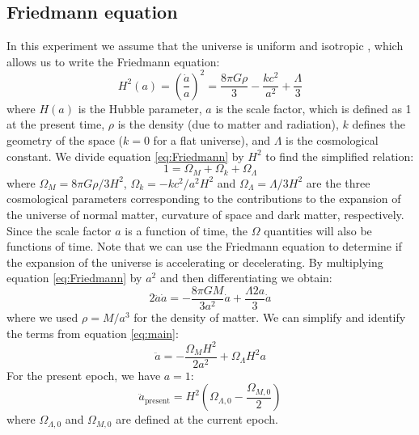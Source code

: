 \documentclass[11pt]{article}
\begin{document}
\subsection{Friedmann equation}
In this experiment we assume that the universe is uniform and isotropic \cite{AS37_lab_script}, which allows us to write the Friedmann equation: 
\begin{equation}
	H^2(a) = \left( \frac{\dot{a}}{a} \right)^2 = \frac{8 \pi G \rho}{3} - \frac{k c^2}{a^2} + \frac{\Lambda}{3}
	\label{eq:Friedmann}
\end{equation}
where $H(a)$ is the Hubble parameter, $a$ is the scale factor, which is defined as 1 at the present time, $\rho$ is the density (due to matter and radiation), $k$ defines the geometry of the space ($k=0$ for a flat universe), and $\Lambda$ is the cosmological constant. We divide equation \eqref{eq:Friedmann} by $H^2$ to find the simplified relation: 
\begin{equation}
	1 = \Omega_M +\Omega_k + \Omega_\Lambda
	\label{eq:main}
\end{equation}
where $\Omega_M = 8 \pi G \rho / 3 H^2$, $\Omega_k = - k c^2 / a^2 H^2$ and $\Omega_\Lambda = \Lambda / 3 H^2$ are the three cosmological parameters corresponding to the contributions to the expansion of the universe of normal matter, curvature of space and dark matter, respectively. Since the scale factor $a$ is a function of time, the $\Omega$ quantities will also be functions of time. 
Note that we can use the Friedmann equation to determine if the expansion of the universe is accelerating or decelerating. By multiplying equation \eqref{eq:Friedmann} by $a^2$ and then differentiating we obtain: 
\begin{equation}
	2 \ddot{a} \dot{a} = -\frac{8 \pi G M}{3 a^2} \dot{a} + \frac{\Lambda 2 a}{3}  \dot{a}
\end{equation}
where we used $\rho = M/a^3$ for the density of matter. We can simplify and identify the terms from equation \eqref{eq:main}:
\begin{equation}
	\ddot{a} = -\frac{\Omega_M H^2}{2 a^2} + \Omega_{\Lambda} H^2 a
\end{equation}
For the present epoch, we have $a = 1$: 
\begin{equation}
	\ddot{a}_{\mathrm{present}} = H^2 \left(\Omega_{\Lambda,0} - \frac{\Omega_{M,0}}{2}\right)
	\label{eq:exp}
\end{equation}
where $\Omega_{\Lambda,0}$ and $\Omega_{M,0}$ are defined at the current epoch. 
\end{document}
